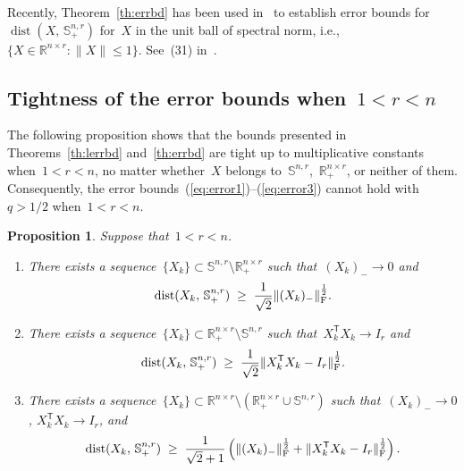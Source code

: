 \documentclass[11pt,a4paper]{article}  %
\newtheorem{proposition}{Proposition}%
\theoremstyle{definition}
\DeclareMathOperator{\dist}{dist}
\newcommand{\RR}{\mathbb{R}}
\newcommand{\col}{r}
\newcommand{\stf}[1]{\mathbb{S}^{#1}}
\newcommand{\fro}{{\scriptstyle{\textnormal{F}}}}
\newcommand{\trs}{{\scriptstyle{\mathsf{T}}}}
\begin{document}
Recently, Theorem~\ref{th:errbd} has been used in~\cite{Anthony1,Anthony2} to establish error bounds
for~$\dist(X,\, \stf{n,\col}_+)$ for~$X$ in the  unit ball of  spectral norm, i.e.,~$\{X\in
\RR^{n\times \col} : \|X\|\le 1\}$. See~(31) in~\cite{Anthony1}.

\subsection{Tightness of the error bounds when~$1 < \col < n$}
\label{ssec:tight}

The following proposition shows that the bounds presented in
Theorems~\ref{th:lerrbd} and~\ref{th:errbd} are tight up to multiplicative constants
when~$1<\col < n$,
no matter whether~$X$ belongs
to~$\stf{n,\col}$,~$\RR^{n\times \col}_+$, or neither of them.
Consequently, the error bounds~(\ref{eq:error1})--(\ref{eq:error3}) cannot hold with~$q>1/2$
when~$1< \col < n$.
\begin{proposition}
    \label{prop:tight}
    Suppose that~$1 < \col <  n$.
    \begin{enumerate}
        \item\label{it:terrbds}
            There exists a sequence~$\{X_k\}\subset\stf{n, \col}\setminus\RR^{n\times \col}_+$ such
            that~$(X_k)_{-} \to 0$ and
            \begin{equation}
                \label{eq:terrbds}
                \dist(X_k,\, \stf{n,\col}_+) \;\ge\; \frac{1}{\sqrt{2}} \|(X_k)_{-}\|_{\fro}^{\frac{1}{2}}.
            \end{equation}
        \item\label{it:terrbdr+}
            There exists a sequence~$\{X_k\}\subset\RR^{n\times \col}_+\setminus\stf{n,\col}$ such
            that~$X_k^\trs X_k \to I_\col$ and
            \begin{equation}
                \label{eq:terrbdr+}
            \dist(X_k,\, \stf{n,\col}_+) \;\ge\; \frac{1}{\sqrt{2}}\| X_k^\trs X_k - I_\col \|_{\fro}^{\frac{1}{2}}.
            \end{equation}
        \item\label{it:terrbdr}
            There exists a sequence~$\{X_k\}\subset\RR^{n\times \col} \setminus(\RR^{n\times \col}_+\cup \stf{n,\col})$
            such that~$(X_k)_{-}\to 0$, $X_k^\trs X_k \to I_\col$,  and
            \begin{equation}
                \label{eq:terrbdr}
            \dist(X_k,\, \stf{n,\col}_+)
            \;\ge\; \frac{1}{\sqrt{2}+1}\left(\|({X_k})_{-}\|_\fro^{\frac{1}{2}} + \| X_k^\trs X_k - I_\col \|_{\fro}^{\frac{1}{2}} \right).
            \end{equation}
    \end{enumerate}
\end{proposition}
\end{document}
